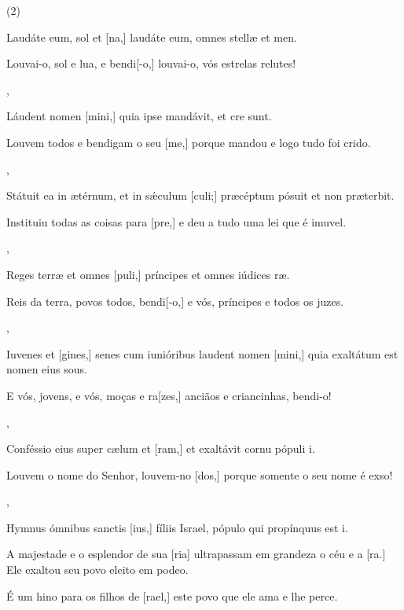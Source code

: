 \SetVersePairs(2){
  {\item {}Laudáte eum, sol et [na,] laudáte eum, omnes stellæ et men.}%
    {\item {}Louvai-o, sol e lua, e bendi[-o,] louvai-o, vós estrelas relutes!},
  {\item {}Láudent nomen [mini,] quia ipse mandávit, et cre sunt.}%
    {\item {}Louvem todos e bendigam o seu [me,] porque mandou e logo tudo foi crido.},
  {\item {}Státuit ea in ætérnum, et in sǽculum [culi;] præcéptum pósuit et non præterbit.}%
    {\item {}Instituiu todas as coisas para [pre,] e deu a tudo uma lei que é imuvel.},
  {\item {}Reges terræ et omnes [puli,] príncipes et omnes iúdices ræ.}%
    {\item {}Reis da terra, povos todos, bendi[-o,] e vós, príncipes e todos os juzes.},
  {\item {}Iuvenes et [gines,] senes cum iunióribus laudent nomen [mini,] quia exaltátum est nomen eius sous.}%
    {\item {}E vós, jovens, e vós, moças e ra[zes,] anciãos e criancinhas, bendi-o!},
  {\item {}Conféssio eius super cælum et [ram,] et exaltávit cornu pópuli i.}%
    {\item {}Louvem o nome do Senhor, louvem-no [dos,] porque somente o seu nome é exso!},
  {\item {}Hymnus ómnibus sanctis [ius,] fíliis Israel, pópulo qui propínquus est i.}%
    {\item {}A majestade e o esplendor de sua [ria] ultrapassam em grandeza o céu e a [ra.] Ele exaltou seu povo eleito em podeo.
      \item {}É um hino para os filhos de [rael,] este povo que ele ama e lhe perce.}
}